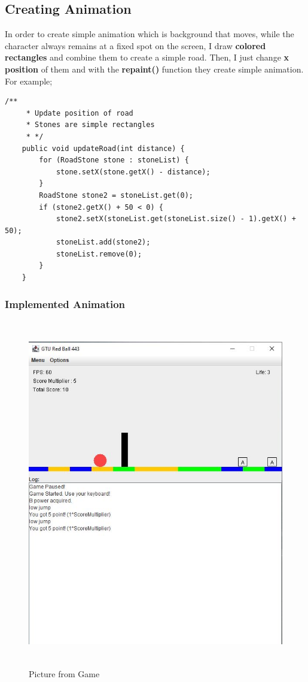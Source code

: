\documentclass{article}
\begin{document}
\subsection{Creating Animation}
In order to create simple animation which is background that moves, while the character always remains at a fixed spot on the screen, I draw  
\textbf{colored rectangles} and combine them to create a simple road. Then, I just change \textbf{x position} of them and with the \textbf{repaint()} function
they create simple animation. For example;
\cleardoublepage
\begin{lstlisting}[style=CStyle]
	/**
     * Update position of road
     * Stones are simple rectangles
     * */
    public void updateRoad(int distance) {
        for (RoadStone stone : stoneList) {
            stone.setX(stone.getX() - distance);
        }
        RoadStone stone2 = stoneList.get(0);
        if (stone2.getX() + 50 < 0) {
            stone2.setX(stoneList.get(stoneList.size() - 1).getX() + 50);
            stoneList.add(stone2);
            stoneList.remove(0);
        }
    }
\end{lstlisting}

\subsubsection{Implemented Animation}
\begin{figure}[H]
    \centering
	\includegraphics[width=7in, height=6in]{t1.JPG}
	\caption[Optional caption]{Picture from Game}
	\label{}
\end{figure}
\end{document}
